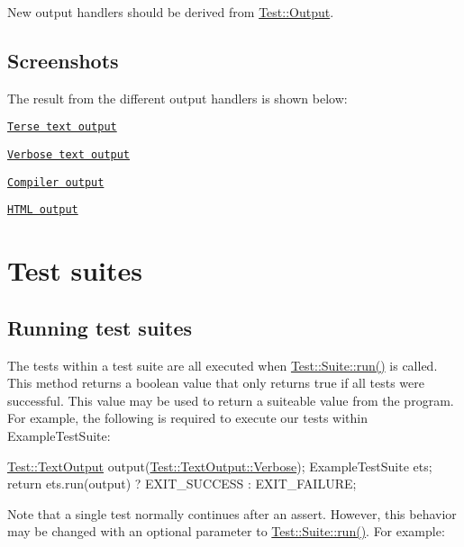 New output handlers should be derived from \hyperlink{class_test_1_1_output}{Test\+::\+Output}.\hypertarget{tutorial_tutorial_screenshots}{}\subsection{Screenshots}\label{tutorial_tutorial_screenshots}
The result from the different output handlers is shown below\+:


\begin{DoxyItemize}
\item \href{screenshot-text-terse.png}{\tt Terse text output}
\item \href{screenshot-text-verbose.png}{\tt Verbose text output}
\item \href{screenshot-compiler.png}{\tt Compiler output}
\item \href{html-example.html}{\tt H\+T\+ML output}
\end{DoxyItemize}\hypertarget{tutorial_tutorial_test_suites}{}\section{Test suites}\label{tutorial_tutorial_test_suites}
\hypertarget{tutorial_tutorial_running_test_suites}{}\subsection{Running test suites}\label{tutorial_tutorial_running_test_suites}
The tests within a test suite are all executed when \hyperlink{class_test_1_1_suite_ad17746e218da79c537bc9d21e389f570}{Test\+::\+Suite\+::run()} is called. This method returns a boolean value that only returns true if all tests were successful. This value may be used to return a suiteable value from the program. For example, the following is required to execute our tests within {\ttfamily Example\+Test\+Suite}\+:


\begin{DoxyCode}
\hyperlink{class_test_1_1_text_output}{Test::TextOutput} output(\hyperlink{class_test_1_1_text_output_ae7b22c9458e6c566996bf4517c73feb1a85dd6e42f6261a23fd504201f5cc2792}{Test::TextOutput::Verbose});
ExampleTestSuite ets;
\textcolor{keywordflow}{return} ets.run(output) ? EXIT\_SUCCESS : EXIT\_FAILURE;
\end{DoxyCode}


Note that a single test normally continues after an assert. However, this behavior may be changed with an optional parameter to \hyperlink{class_test_1_1_suite_ad17746e218da79c537bc9d21e389f570}{Test\+::\+Suite\+::run()}. For example\+:


